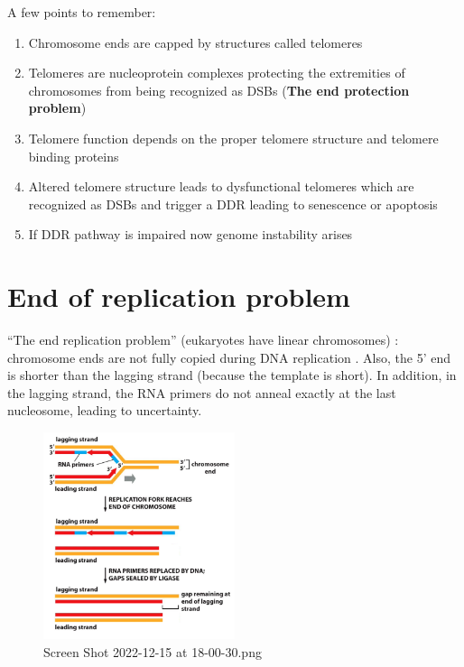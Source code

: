 A few points to remember:

\begin{enumerate}
\def\labelenumi{\arabic{enumi}.}
\tightlist
\item
  Chromosome ends are capped by structures called telomeres
\item
  Telomeres are nucleoprotein complexes protecting the extremities of
  chromosomes from being recognized as DSBs (\textbf{The end protection
  problem})
\item
  Telomere function depends on the proper telomere structure and
  telomere binding proteins
\item
  Altered telomere structure leads to dysfunctional telomeres which are
  recognized as DSBs and trigger a DDR leading to senescence or
  apoptosis
\item
  If DDR pathway is impaired now genome instability arises
\end{enumerate}

\hypertarget{end-of-replication-problem}{%
\section{End of replication problem}\label{end-of-replication-problem}}

``The end replication problem'' (eukaryotes have linear chromosomes) :
chromosome ends are not fully copied during DNA replication . Also, the
5' end is shorter than the lagging strand (because the template is
short). In addition, in the lagging strand, the RNA primers do not
anneal exactly at the last nucleosome, leading to uncertainty.

\begin{figure}
\centering
\includegraphics[width=0.5\textwidth]{../_resources/Screen_Shot_2022-12-15_at_18-00-30.png}
\caption{Screen Shot 2022-12-15 at 18-00-30.png}
\end{figure}

